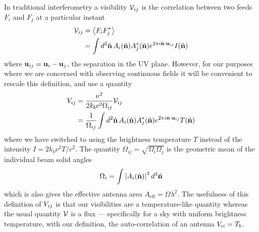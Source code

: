 \documentclass[prd,twocolumn,nofootinbib]{revtex4}
\begin{document}
In traditional interferometry a visibility $\mathcal{V}_{ij}$ is the correlation
between two feeds $F_i$ and $F_j$ at a particular instant
\begin{align}
  \mathcal{V}_{ij} & = \left\langle F_i F_j^* \right\rangle \\
  &= \int d^2\hat{\mathbf{n}} \, A_i(\hat{\mathbf{n}}) A_j^*(\hat{\mathbf{n}}) e^{2 \pi i \hat{\mathbf{n}} \cdot \mathbf{u}_{ij}}
  I(\hat{\mathbf{n}})
\end{align}
where $\mathbf{u}_{ij} = \mathbf{u}_i - \mathbf{u}_j$, the separation in the UV plane. However, for
our purposes where we are concerned with observing continuous fields it will be
convenient to rescale this definition, and use a quantity
\begin{align}
\label{eq:nvis}
V_{ij} & = \frac{\nu^2}{2 k_b c^2 \Omega_{ij}} \mathcal{V}_{ij} \\ 
&= \frac{1}{\Omega_{ij}}\int d^2\hat{\mathbf{n}} \, A_i(\hat{\mathbf{n}}) A_j^*(\hat{\mathbf{n}})
  e^{2 \pi i \hat{\mathbf{n}} \cdot \mathbf{u}_{ij}} T(\hat{\mathbf{n}})
\end{align}
where we have switched to using the brightness temperature $T$ instead of the
intensity $I = 2 k_b \nu^2 T / c^2$. The quantity $\Omega_{ij} = \sqrt{\Omega_i
  \Omega_j}$ is the geometric mean of the individual beam solid angles
\begin{equation}
\Omega_i = \int \left\lvert A_i(\hat{\mathbf{n}}) \right\rvert^2 d^2\hat{\mathbf{n}}
\end{equation}
which is also gives the effective antenna area $A_\text{eff} = \Omega
\lambda^2$. The usefulness of this definition of $V_{ij}$ is that our
visibilities are a temperature-like quantity whereas the usual quantity $\mathcal{V}$
is a flux --- specifically for a sky with uniform brightness temperature, with
our definition, the auto-correlation of an antenna $V_{ii} = T_b$.
\end{document}
